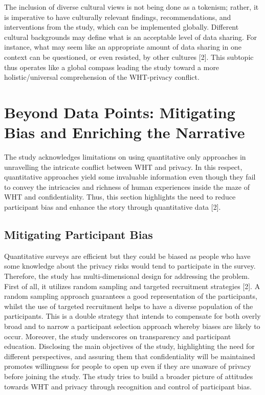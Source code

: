 \documentclass[11pt]{article}
\begin{document}
The inclusion of diverse cultural views is not being done as a tokenism; rather, it is imperative to have culturally relevant findings, recommendations, and interventions from the study, which can be implemented globally. Different cultural backgrounds may define what is an acceptable level of data sharing. For instance, what may seem like an appropriate amount of data sharing in one context can be questioned, or even resisted, by other cultures [2]. This subtopic thus operates like a global compass leading the study toward a more holistic/universal comprehension of the WHT-privacy conflict.

\section{Beyond Data Points: Mitigating Bias and Enriching the Narrative}

The study acknowledges limitations on using quantitative only approaches in unravelling the intricate conflict between WHT and privacy. In this respect, quantitative approaches yield some invaluable information even though they fail to convey the intricacies and richness of human experiences inside the maze of WHT and confidentiality. Thus, this section highlights the need to reduce participant bias and enhance the story through quantitative data [2].

\subsection{Mitigating Participant Bias}

Quantitative surveys are efficient but they could be biased as people who have some knowledge about the privacy risks would tend to participate in the survey. Therefore, the study has multi-dimensional design for addressing the problem. First of all, it utilizes random sampling and targeted recruitment strategies [2]. A random sampling approach guarantees a good representation of the participants, whilst the use of targeted recruitment helps to have a diverse population of the participants. This is a double strategy that intends to compensate for both overly broad and to narrow a participant selection approach whereby biases are likely to occur. Moreover, the study underscores on transparency and participant education. Disclosing the main objectives of the study, highlighting the need for different perspectives, and assuring them that confidentiality will be maintained promotes willingness for people to open up even if they are unaware of privacy before joining the study. The study tries to build a broader picture of attitudes towards WHT and privacy through recognition and control of participant bias.
\end{document}
